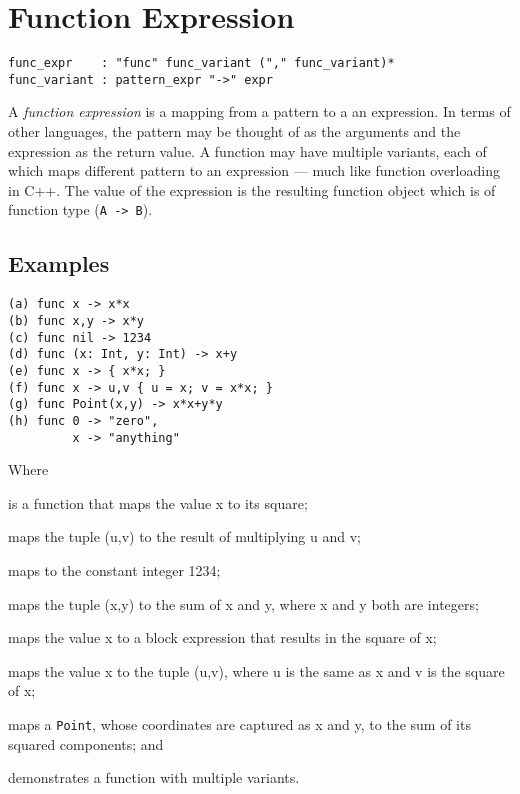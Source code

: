 \section{Function Expression}

\begin{lstlisting}[language=EBNF]
func_expr    : "func" func_variant ("," func_variant)*
func_variant : pattern_expr "->" expr
\end{lstlisting}

A \emph{function expression} is a mapping from a pattern to a an expression. In
terms of other languages, the pattern may be thought of as the arguments and the
expression as the return value. A function may have multiple variants, each
of which maps different pattern to an expression --- much like function
overloading in C++. The value of the expression is the resulting function object
which is of function type (\lstinline{A -> B}).

\subsection{Examples}

\begin{lstlisting}
(a) func x -> x*x
(b) func x,y -> x*y
(c) func nil -> 1234
(d) func (x: Int, y: Int) -> x+y
(e) func x -> { x*x; }
(f) func x -> u,v { u = x; v = x*x; }
(g) func Point(x,y) -> x*x+y*y
(h) func 0 -> "zero",
         x -> "anything"
\end{lstlisting}

Where \begin{exdesc}
	\item is a function that maps the value x to its square;
	\item maps the tuple (u,v) to the result of multiplying u and v;
	\item maps to the constant integer 1234;
	\item maps the tuple (x,y) to the sum of x and y, where x and y both are
	      integers;
	\item maps the value x to a block expression that results in the square of
	      x;
	\item maps the value x to the tuple (u,v), where u is the same as x and v is
	      the square of x;
	\item maps a \lstinline{Point}, whose coordinates are captured as x and y,
	      to the sum of its squared components; and
	\item demonstrates a function with multiple variants.
\end{exdesc}
